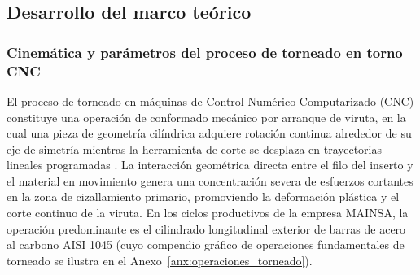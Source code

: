 \subsection{Desarrollo del marco teórico}

\subsubsection{Cinemática y parámetros del proceso de torneado en torno CNC}

El proceso de torneado en máquinas de Control Numérico Computarizado (CNC) constituye una operación de conformado mecánico por arranque de viruta, en la cual una pieza de geometría cilíndrica adquiere rotación continua alrededor de su eje de simetría mientras la herramienta de corte se desplaza en trayectorias lineales programadas \citep{groover2010}. La interacción geométrica directa entre el filo del inserto y el material en movimiento genera una concentración severa de esfuerzos cortantes en la zona de cizallamiento primario, promoviendo la deformación plástica y el corte continuo de la viruta. En los ciclos productivos de la empresa MAINSA, la operación predominante es el cilindrado longitudinal exterior de barras de acero al carbono AISI 1045 (cuyo compendio gráfico de operaciones fundamentales de torneado se ilustra en el Anexo~\ref{anx:operaciones_torneado}).

